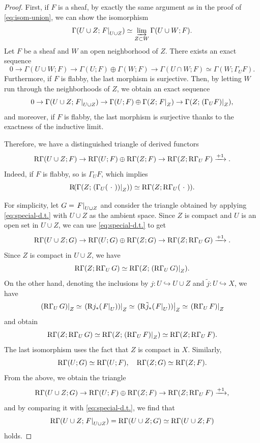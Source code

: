 \begin{proof}
  First, if \(F\) is a sheaf, 
  by exactly the same argument as 
  in the proof of \eqref{eq:isom-union}, 
  we can show the isomorphism
  \[
    \Gamma(U \cup Z; \mres[F]{U \cup Z}) \simeq \indlim[Z \subset W] \Gamma(U \cup W; F).
  \]
  Let \(F\) be a sheaf 
  and \(W\) an open neighborhood of \(Z\). 
  There exists an exact sequence
  \[
    0 \to \Gamma(U \cup W; F) \to \Gamma(U; F) \oplus \Gamma(W; F) \to \Gamma(U \cap W; F) \simeq \Gamma(W; \Gamma_U F).
  \]
  Furthermore, if \(F\) is flabby, 
  the last morphism is surjective. 
  Then, by letting \(W\) run through 
  the neighborhoods of \(Z\), we obtain an exact sequence
  \[
    0 \to \Gamma(U \cup Z; \mres[F]{U \cup Z}) \to \Gamma(U; F) \oplus \Gamma(Z; \mres[F]{Z}) \to \Gamma(Z; \mres[(\Gamma_U F)]{Z}),
  \]
  and moreover, if \(F\) is flabby, 
  the last morphism is surjective thanks to the exactness 
  of the inductive limit.

  Therefore, we have a distinguished triangle of derived functors
  \begin{equation}\label{eq:special-d.t.}
    \RG(U \cup Z; F) \to \RG(U; F) \oplus \RG(Z; F) \to \RG(Z; \RG_U F) \xrightarrow{+1}.
  \end{equation}
  Indeed, if \(F\) is flabby, 
  so is \(\Gamma_U F\), which implies
  \[
    \Rder(\Gamma(Z; \mres[(\Gamma_U(\blk))]{Z})) 
    \simeq 
    \RG(Z; \RG_U(\blk)).
  \]

  For simplicity, 
  let \(G = \mres[F]{U \cup Z}\) and 
  consider the triangle obtained 
  by applying \eqref{eq:special-d.t.} 
  with \(U \cup Z\) as the ambient space.  
  Since \(Z\) is compact and \(U\) is an open set 
  in \(U \cup Z\), 
  we can use \eqref{eq:special-d.t.} 
  to get
  \[
    \RG(U \cup Z; G) \to 
    \RG(U; G) \oplus \RG(Z; G) 
    \to \RG(Z; \RG_U G) \xrightarrow{+1}.
  \]
  Since \(Z\) is compact in \(U \cup Z\), 
  we have
  \[
    \RG(Z; \RG_U G) \simeq \RG(Z; \mres[(\RG_U G)]{Z}).
  \]
  On the other hand, 
  denoting the inclusions by
  \(j \colon U \hookrightarrow U \cup Z\) and 
  \(\tilde{j} \colon U \hookrightarrow X\), 
  we have
  \[
    \mres[(\RG_U G)]{Z} 
    \simeq 
    \mres[{(\Rder j_{\ast}(\mres[F]{U}))}]{Z} 
    \simeq 
    \mres[{(\Rder\tilde{j}_{\ast}(\mres[F]{U}))}]{Z} 
    \simeq \mres[(\RG_U F)]{Z}
  \]
  and obtain
  \[
    \RG(Z; \RG_U G) \simeq \RG(Z; \mres[(\RG_U F)]{Z}) \simeq \RG(Z; \RG_U F).
  \]
  The last isomorphism uses the fact that \(Z\) is compact in \(X\). Similarly,
  \[
    \RG(U; G) \simeq \RG(U; F), \quad \RG(Z; G) \simeq \RG(Z; F).
  \]
  From the above, we obtain the triangle
  \[
    \RG(U \cup Z; G) \to \RG(U; F) \oplus \RG(Z; F) \to \RG(Z; \RG_U F) \xrightarrow{+1},
  \]
  and by comparing it with \eqref{eq:special-d.t.}, 
  we find that
  \[
    \RG(U \cup Z; \mres[F]{U \cup Z}) = \RG(U \cup Z; G) \simeq \RG(U \cup Z; F)
  \]
  holds.
\end{proof}

